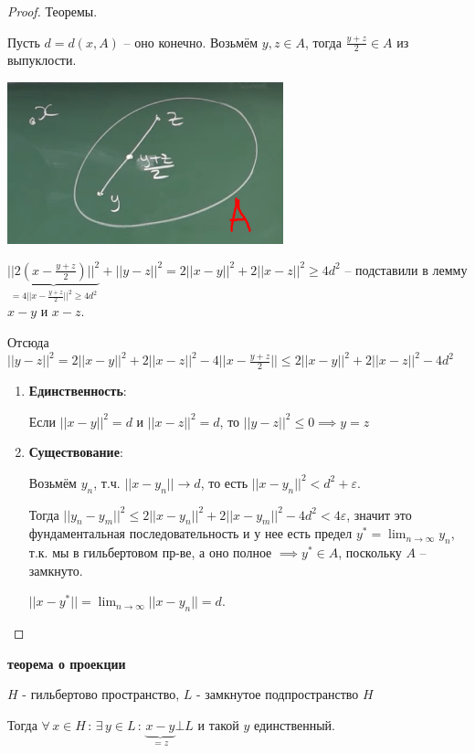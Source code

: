 \begin{proof}
    Теоремы.

    Пусть $d = d(x, A)$ -- оно конечно. Возьмём $y, z \in A$, тогда $\frac{y + z}{2} \in A$ из выпуклости.

    \begin{center}
        \includegraphics[width=8cm]{assets/05-fourierreihe/existance-of-the-best-approximation.png}
    \end{center}
    
    $\underbrace{|| 2 \left(x - \frac{y + z}{2}\right) ||^2}_{= 4 || x - \frac{y + z}{2} ||^2 \geqslant 4d^2} + ||y - z||^2 = 2 ||x - y||^2 + 2||x - z||^2 \geqslant 4d^2$ -- подставили в лемму $x - y$ и $x - z$.

    Отсюда $||y-z||^2 = 2 ||x - y||^2 + 2 ||x - z||^2 - 4 || x - \frac{y + z}{2}|| \leqslant 2 ||x - y||^2 + 2||x - z||^2 - 4d^2$

    \begin{enumerate}
        \item {
            \textbf{Единственность}:

            Если $||x - y||^2 = d$ и $||x - z||^2 = d$, то $||y - z||^2 \leqslant 0 \implies y = z$
        }
        \item {
            \textbf{Существование}:

            Возьмём $y_n$, т.ч. $||x - y_n|| \rightarrow d$, то есть $|| x - y_n ||^2 < d^2 + \varepsilon$.
            
            Тогда $||y_n - y_m||^2 \leqslant 2 ||x - y_n||^2 + 2||x - y_m||^2 - 4d^2 < 4\varepsilon$, значит это фундаментальная последовательность и у нее есть предел $y^* = \lim_{n \to \infty} y_n$, т.к. мы в гильбертовом пр-ве, а оно полное $\implies y^* \in A$, поскольку $A$ -- замкнуто.
            
            $||x - y^*|| = \lim_{n \to \infty} ||x - y_n|| = d$.
        }
    \end{enumerate}
\end{proof}

\begin{theorem}
    \textbf{теорема о проекции}

    $H$ - гильбертово пространство, $L$ - замкнутое подпространство $H$

    Тогда $\forall \, x \in H \, : \, \exists \, y \in L \, : \, \underbrace{x - y}_{=z} \bot L$ и 
    такой $y$ единственный.
\end{theorem}

